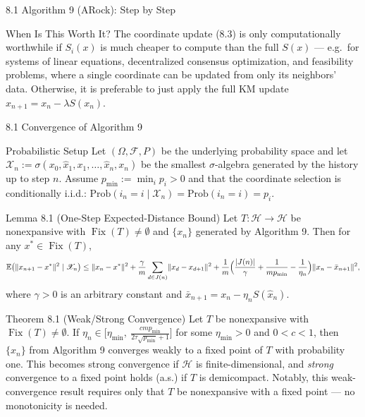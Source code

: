 \documentclass[aspectratio=169,10pt]{beamer}
\newcommand{\Hsp}{\mathcal H}
\newcommand{\Fix}{\operatorname{Fix}}
\newcommand{\norm}[1]{\lVert #1 \rVert}
\begin{document}
\begin{frame}[allowframebreaks]{8.1 Algorithm 9 (ARock): Step by Step}
\begin{alertblock}{When Is This Worth It?}
The coordinate update (8.3) is only computationally worthwhile if $S_i(x)$ is much cheaper to compute than the full $S(x)$ --- e.g.\ for systems of linear equations, decentralized consensus optimization, and feasibility problems, where a single coordinate can be updated from only its neighbors' data. Otherwise, it is preferable to just apply the full KM update $x_{n+1}=x_n-\lambda S(x_n)$.
\end{alertblock}

\end{frame}

\begin{frame}[allowframebreaks]{8.1 Convergence of Algorithm 9}

\begin{block}{Probabilistic Setup}
Let $(\Omega,\mathscr F,P)$ be the underlying probability space and let $\mathscr X_n:=\sigma(x_0,\hat x_1,x_1,\ldots,\hat x_n,x_n)$ be the smallest $\sigma$-algebra generated by the history up to step $n$. Assume $p_{\min}:=\min_i p_i>0$ and that the coordinate selection is conditionally i.i.d.: $\mathrm{Prob}(i_n=i\mid \mathscr X_n)=\mathrm{Prob}(i_n=i)=p_i$.
\end{block}

\begin{block}{Lemma 8.1 (One-Step Expected-Distance Bound)}
Let $T:\Hsp\to\Hsp$ be nonexpansive with $\Fix(T)\neq\emptyset$ and $\{x_n\}$ generated by Algorithm 9. Then for any $x^*\in\Fix(T)$,
\[
\mathbb E\bigl(\norm{x_{n+1}-x^*}^2\mid\mathscr X_n\bigr) \le \norm{x_n-x^*}^2 + \frac{\gamma}{m}\sum_{d\in J(n)}\norm{x_d-x_{d+1}}^2
 + \frac{1}{m}\Bigl(\frac{|J(n)|}{\gamma}+\frac{1}{mp_{\min}}-\frac{1}{\eta_n}\Bigr)\norm{x_n-\bar x_{n+1}}^2,
\]
where $\gamma>0$ is an arbitrary constant and $\bar x_{n+1}=x_n-\eta_n S(\hat x_n)$.
\end{block}

\begin{block}{Theorem 8.1 (Weak/Strong Convergence)}
Let $T$ be nonexpansive with $\Fix(T)\neq\emptyset$. If $\eta_n\in\bigl[\eta_{\min},\ \frac{cmp_{\min}}{2\tau\sqrt{p_{\min}}+1}\bigr]$ for some $\eta_{\min}>0$ and $0<c<1$, then $\{x_n\}$ from Algorithm 9 converges weakly to a fixed point of $T$ with probability one. This becomes strong convergence if $\Hsp$ is finite-dimensional, and \emph{strong} convergence to a fixed point holds (a.s.) if $T$ is demicompact. Notably, this weak-convergence result requires only that $T$ be nonexpansive with a fixed point --- no monotonicity is needed.
\end{block}


\end{frame}
\end{document}

